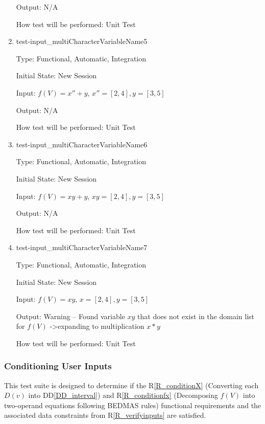\documentclass[12pt, titlepage]{article}
\newcommand{\rref}[1]{R\ref{#1}}
\newcommand{\ddref}[1]{DD\ref{#1}}
\begin{document}
\begin{enumerate}
	Output: N/A
	
	How test will be performed: Unit Test\\
	
	\item{test-input\_multiCharacterVariableName5}
	
	Type: Functional, Automatic, Integration
	
	Initial State: New Session
	
	Input: $f(V) = x'' + y$, $x'' = [2,4], y = [3,5]$
	
	Output: N/A
	
	How test will be performed: Unit Test\\
	
	\item{test-input\_multiCharacterVariableName6}
	
	Type: Functional, Automatic, Integration
	
	Initial State: New Session
	
	Input: $f(V) = xy + y$, $xy = [2,4], y = [3,5]$
	
	Output: N/A
	
	How test will be performed: Unit Test\\
	
	\item{test-input\_multiCharacterVariableName7}
	
	Type: Functional, Automatic, Integration
	
	Initial State: New Session
	
	Input: $f(V) = xy$, $x = [2,4], y = [3,5]$
	
	Output: Warning -- Found variable $xy$ that does not exist in the domain 
	list for $f(V)$ -\textgreater expanding to multiplication $x * y$
	
	How test will be performed: Unit Test\\
	
\end{enumerate}

\subsubsection{Conditioning User Inputs}
\label{tests_conditioningInputs}
This test suite is designed to determine if the \rref{R_conditionX} (Converting 
each $D(v)$ into \ddref{DD_interval}) and \rref{R_conditionfx} (Decomposing 
$f(V)$ into two-operand equations following BEDMAS rules) functional 
requirements and the associated data constraints from \rref{R_verifyinputs} are 
satisfied.
\end{document}
